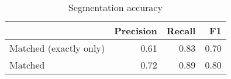 \begin{table}[!ht]
\centering
\begin{tabular}{lrrr}
\toprule
{} &  Precision &  Recall &   F1 \\
\midrule
Matched (exactly only) &       0.61 &    0.83 & 0.70 \\
Matched                &       0.72 &    0.89 & 0.80 \\
\bottomrule
\end{tabular}
\caption{Segmentation accuracy}
\label{tab:segmentation-accuracy}
\end{table}